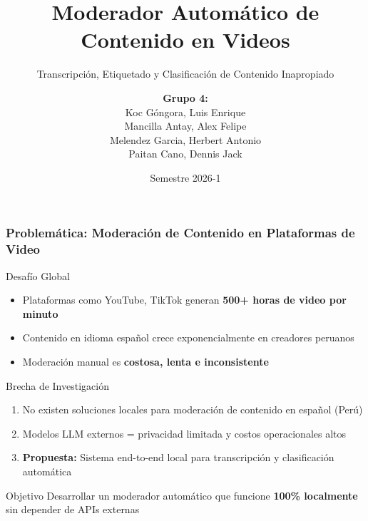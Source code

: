 \documentclass[aspectratio=169,10pt]{beamer}
\title{Moderador Automático de Contenido en Videos}
\subtitle{Transcripción, Etiquetado y Clasificación de Contenido Inapropiado}
\author{
  \textbf{Grupo 4:}\\
  Koc Góngora, Luis Enrique\\
  Mancilla Antay, Alex Felipe\\
  Melendez Garcia, Herbert Antonio\\
  Paitan Cano, Dennis Jack
}
\institute{
Maestría en Inteligencia Artificial\\
Universidad Nacional de Ingeniería (UNI)\\
Procesamiento de Lenguaje Natural
}
\date{Semestre 2026-1}
\begin{document}
\begin{frame}
  \titlepage
\end{frame}

\begin{frame}
  \frametitle{Problemática: Moderación de Contenido en Plataformas de Video}
  
  \begin{block}{Desafío Global}
    \begin{itemize}
      \item Plataformas como YouTube, TikTok generan \textbf{500+ horas de video por minuto}
      \item Contenido en idioma español crece exponencialmente en creadores peruanos
      \item Moderación manual es \textbf{costosa, lenta e inconsistente}
    \end{itemize}
  \end{block}
  
  \begin{block}{Brecha de Investigación}
    \begin{enumerate}
      \item No existen soluciones locales para moderación de contenido en español (Perú)
      \item Modelos LLM externos = privacidad limitada y costos operacionales altos
      \item \textbf{Propuesta:} Sistema end-to-end local para transcripción y clasificación automática
    \end{enumerate}
  \end{block}

  \begin{block}{Objetivo}
    Desarrollar un moderador automático que funcione \textbf{100\% localmente} sin depender de APIs externas
  \end{block}
\end{frame}
\end{document}
